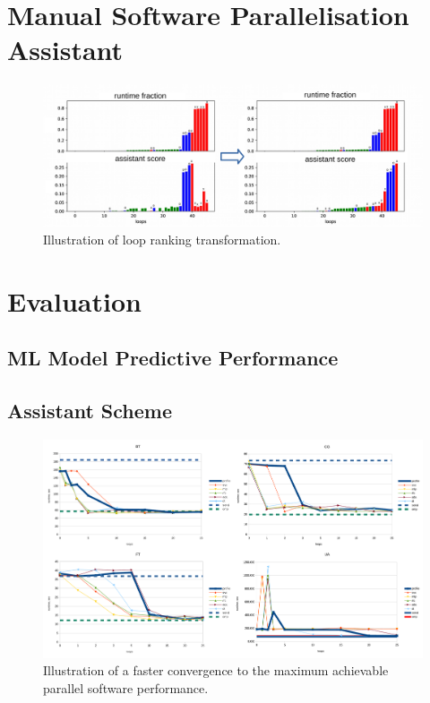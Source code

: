 \documentclass{acaces}
\begin{document}
\section{Manual Software Parallelisation Assistant}

\begin{figure}
\centering
\includegraphics[width=1.0\textwidth]{ft_ranking}
\caption{Illustration of loop ranking transformation.}
\label{logo}
\end{figure}


\section{Evaluation}

\subsection{ML Model Predictive Performance}


\subsection{Assistant Scheme}

\begin{figure}
\centering
\includegraphics[width=1.0\textwidth]{parallelisation_acceleration}
\caption{Illustration of a faster convergence to the maximum achievable parallel software performance.}
\label{logo}
\end{figure}


\end{document}

